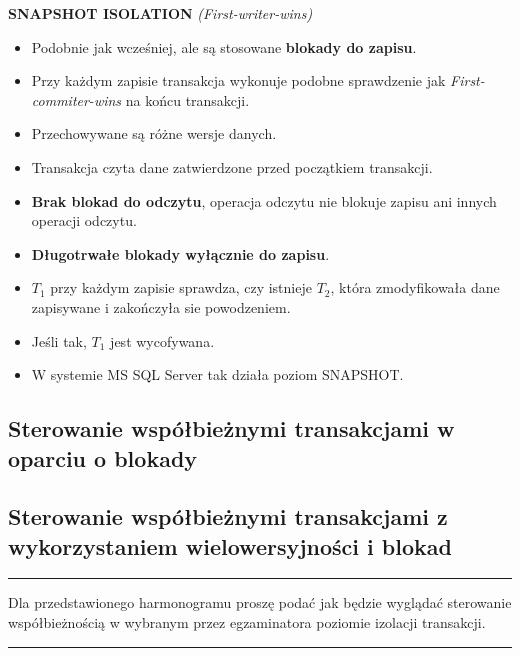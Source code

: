 \documentclass[a5paper,6pt]{article}
\newcommand{\horrule}[1]{\rule{\linewidth}{#1}}
\begin{document}
    \textbf{SNAPSHOT ISOLATION} \textit{(First-writer-wins)}
    \begin{itemize}
        \item Podobnie jak wcześniej, ale są stosowane
              \textbf{blokady do zapisu}.
        \item Przy każdym zapisie transakcja wykonuje podobne sprawdzenie jak
              \textit{First-commiter-wins} na końcu transakcji.
        \item Przechowywane są różne wersje danych.
        \item Transakcja czyta dane zatwierdzone przed początkiem transakcji.
        \item \textbf{Brak blokad do odczytu}, operacja odczytu nie blokuje
              zapisu ani innych operacji odczytu.
        \item \textbf{Długotrwałe blokady wyłącznie do zapisu}.
        \item $T_1$ przy każdym zapisie sprawdza, czy istnieje $T_2$, która
              zmodyfikowała dane zapisywane i zakończyła sie powodzeniem.
        \item Jeśli tak, $T_1$ jest wycofywana.
        \item W systemie MS SQL Server tak działa poziom SNAPSHOT.
    \end{itemize}

\pagebreak

    \subsection{Sterowanie współbieżnymi transakcjami w oparciu o blokady}
    \label{sub:sterowanie_wspolbieznymi_blokady}


    \subsection{Sterowanie współbieżnymi transakcjami z wykorzystaniem
    wielowersyjności i blokad} %
    \label{sub:sterowanie_wspolbieznymi_wielowier}

    \horrule{0.5pt}
    Dla przedstawionego harmonogramu proszę podać jak będzie wyglądać sterowanie
    współbieżnością w wybranym przez egzaminatora poziomie izolacji
    transakcji.\\
    \horrule{0.5pt}
\end{document}
